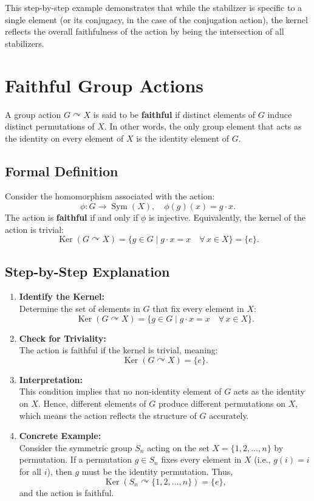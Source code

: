 \documentclass[12pt]{article}
\theoremstyle{definition} %
\theoremstyle{plain} %
\begin{document}
This step-by-step example demonstrates that while the stabilizer is specific to a single element (or its conjugacy, in the case of the conjugation action), the kernel reflects the overall faithfulness of the action by being the intersection of all stabilizers.

\section*{Faithful Group Actions}

A group action \( G \curvearrowright X \) is said to be \textbf{faithful} if distinct elements of \( G \) induce distinct permutations of \( X \). In other words, the only group element that acts as the identity on every element of \( X \) is the identity element of \( G \).

\subsection*{Formal Definition}
Consider the homomorphism associated with the action:
\[
\phi : G \to \operatorname{Sym}(X), \quad \phi(g)(x) = g \cdot x.
\]
The action is \textbf{faithful} if and only if \(\phi\) is injective. Equivalently, the kernel of the action is trivial:
\[
\operatorname{Ker}(G \curvearrowright X) = \{ g \in G \mid g\cdot x = x \quad \forall\, x \in X \} = \{e\}.
\]

\subsection*{Step-by-Step Explanation}
\begin{enumerate}[label=\textbf{Step \arabic*:}]
    \item \textbf{Identify the Kernel:} \\
    Determine the set of elements in \(G\) that fix every element in \(X\):
    \[
    \operatorname{Ker}(G \curvearrowright X) = \{ g \in G \mid g \cdot x = x \quad \forall\, x \in X \}.
    \]
    
    \item \textbf{Check for Triviality:} \\
    The action is faithful if the kernel is trivial, meaning:
    \[
    \operatorname{Ker}(G \curvearrowright X) = \{e\}.
    \]
    
    \item \textbf{Interpretation:} \\
    This condition implies that no non-identity element of \(G\) acts as the identity on \(X\). Hence, different elements of \(G\) produce different permutations on \(X\), which means the action reflects the structure of \(G\) accurately.
    
    \item \textbf{Concrete Example:} \\
    Consider the symmetric group \( S_n \) acting on the set \( X = \{1,2,\dots,n\} \) by permutation. If a permutation \( g \in S_n \) fixes every element in \( X \) (i.e., \( g(i)=i \) for all \( i \)), then \( g \) must be the identity permutation. Thus,
    \[
    \operatorname{Ker}(S_n \curvearrowright \{1,2,\dots,n\}) = \{e\},
    \]
    and the action is faithful.
\end{enumerate}
\end{document}

